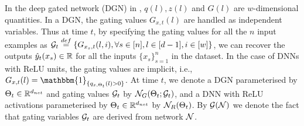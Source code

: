 In the deep gated network (DGN) in , $q(l),z(l)$ and $G(l)$ are $w$-dimensional quantities. In a DGN, the gating values $G_{x,t}(l)$ are handled as independent variables. Thus at time $t$, by specifying the gating values for all the $n$ input examples as $\mathcal{G}_t\stackrel{def}=\{G_{x_{s},t}(l,i), \forall s\in[n],l\in[d-1],i\in[w]\}$, we can recover the outputs $\hat{y}_t(x_s)\in \mathbb{R}$ for all the inputs $\{x_s\}_{s=1}^n$ in the dataset. In the case of DNNs with ReLU units, the gating values are implicit, i.e., $G_{x,t}(l)=\mathbbm{1}_{\{q_{x,\Theta_t}(l)>0\}}$. At time $t$, we denote a DGN parameterised by $\Theta_t\in \mathbb{R}^{d_{net}}$ and gating values $\mathcal{G}_t$ by $\mathcal{N}_G(\Theta_t;\mathcal{G}_t)$, and a DNN with ReLU activations parameterised by $\Theta_t\in\mathbb{R}^{d_{net}}$ by $\mathcal{N}_R(\Theta_t)$. By $\mathcal{G}(\mathcal{N})$ we denote the fact that gating variables  $\mathcal{G}_t$ are derived from network $\mathcal{N}$.
